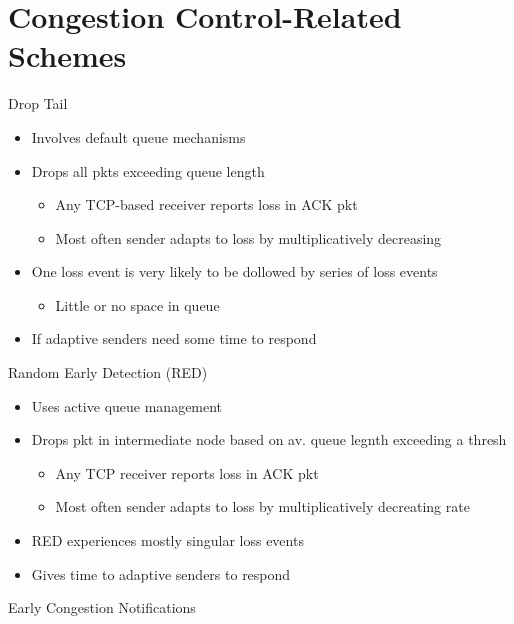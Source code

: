 \section{Congestion Control-Related Schemes}
Drop Tail
\begin{itemize}
	\item Involves default queue mechanisms
	\item Drops all pkts exceeding queue length
	\begin{itemize}
		\item Any TCP-based receiver reports loss in ACK pkt
		\item Most often sender adapts to loss by multiplicatively
			decreasing
	\end{itemize}
	\item One loss event is very likely to be dollowed by series of loss
		events
	\begin{itemize}
		\item Little or no space in queue
	\end{itemize}
	\item If adaptive senders need some time to respond
\end{itemize}
Random Early Detection (RED)
\begin{itemize}
	\item Uses active queue management
	\item Drops pkt in intermediate node based on av. queue legnth exceeding
		a thresh
	\begin{itemize}
		\item Any TCP receiver reports loss in ACK pkt
		\item Most often sender adapts to loss by multiplicatively
			decreating rate
	\end{itemize}
	\item RED experiences mostly singular loss events
	\item Gives time to adaptive senders to respond
\end{itemize}
Early Congestion Notifications
